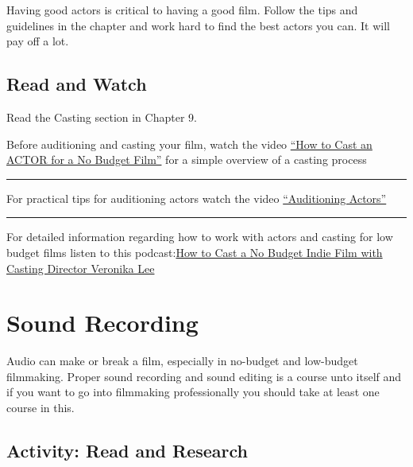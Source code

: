 \documentclass[
]{book}
\begin{document}
Having good actors is critical to having a good film. Follow the tips and guidelines in the chapter and work hard to find the best actors you can. It will pay off a lot.

\hypertarget{read-and-watch}{%
\subsection*{Read and Watch}\label{read-and-watch}}

\begin{reflect}
Read the Casting section in Chapter 9.

Before auditioning and casting your film, watch the video \href{https://www.youtube.com/watch?v=YpCkRPqsiJ4}{``How to Cast an ACTOR for a No Budget Film''} for a simple overview of a casting process

\begin{center}\rule{0.5\linewidth}{0.5pt}\end{center}

For practical tips for auditioning actors watch the video \href{https://www.youtube.com/watch?v=x0G6n346m90}{``Auditioning Actors''}

\begin{center}\rule{0.5\linewidth}{0.5pt}\end{center}

For detailed information regarding how to work with actors and casting for low budget films listen to this podcast:\href{https://www.youtube.com/watch?v=-DwKilT0T34}{How to Cast a No Budget Indie Film with Casting Director Veronika Lee}
\end{reflect}

\hypertarget{sound-recording}{%
\section{Sound Recording}\label{sound-recording}}

Audio can make or break a film, especially in no-budget and low-budget filmmaking. Proper sound recording and sound editing is a course unto itself and if you want to go into filmmaking professionally you should take at least one course in this.

\hypertarget{activity-read-and-research}{%
\subsection*{Activity: Read and Research}\label{activity-read-and-research}}
\end{document}
